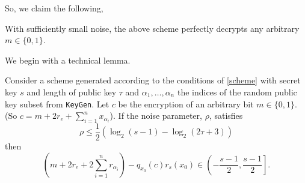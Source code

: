 \documentclass[a4paper,11pt, oneside]{article}
\begin{document}
So, we claim the following,
\begin{theorem}
    With sufficiently small noise, the above scheme perfectly decrypts any arbitrary $m\in\{0,1\}$.
    \label{perfect}
\end{theorem}

We begin with a technical lemma.
\begin{lemma}
    Consider a scheme generated according to the conditions of \ref{scheme} with secret key $s$ and length of public key $\tau$ and $\alpha_1,\dots,\alpha_n$ the indices of the random public key subset from \texttt{KeyGen}.  Let $c$ be the encryption of an arbitrary bit $m\in\{0,1\}$. (So $c = m + 2r_e + \sum_{i=1}^n x_{\alpha_i}$).
    If the noise parameter, $\rho$, satisfies 
    \[\rho \leq \frac{1}{2}\left( \log_2(s-1) - \log_2(2\tau+3)\right)\]
    then 
    \[
        \left(m + 2r_e + 2\sum_{i=1}^n r_{\alpha_i}\right) - q_{x_0}(c)r_s(x_0) \in \left(-\frac{s-1}{2}, \frac{s-1}{2}\right].\]
    \label{bound}
\end{lemma}
\end{document}
